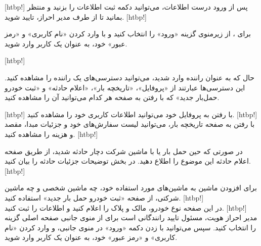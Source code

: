 	[htbp!]
 پس از ورود درست اطلاعات، می‌توانید دکمه ثبت اطلاعات را بزنید و منتظر بمانید تا از طرف مدیر احراز، تایید شوید.
[htbp!]

 
		 برای ، از زیرمنوی  گزینه «ورود» را انتخاب کنید و با وارد کردن «نام کاربری» و «رمز عبور» خود، به عنوان یک کاربر  وارد شوید.

	[htbp!]

	 حال که به عنوان راننده وارد شدید، می‌توانید دسترسی‌های یک راننده را مشاهده کنید. این دسترسی‌ها عبارتند از «پروفایل»، «تاریخچه بار»، «اعلام حادثه» و «ثبت خودرو حمل‌بار جدید» که با رفتن به صفحه هر کدام می‌توانید آن را مشاهده کنید.

	[htbp!]
		 با رفتن به پروفایل خود می‌توانید اطلاعات کاربری خود را مشاهده کنید.
	[htbp!]
	 با رفتن به صفحه تاریخچه بار، می‌توانید لیست سفارش‌های خود و جزئیات مبدا، مقصد و هزینه را مشاهده کنید.
\newpage
				[htbp!]

	 در صورتی که حین حمل بار یا با ماشین شرکت دچار حادثه شدید، از طریق صفحه اعلام حادثه این موضوع را اطلاع دهید. در بخش توضیحات جزئیات حادثه را بیان کنید.
				[htbp!]

	 برای افزودن ماشین به ماشین‌های مورد استفاده خود، چه ماشین شخصی و چه ماشین شرکتی، از صفحه «ثبت خودرو حمل بار جدید» استفاده کنید.
				[htbp!]
\\
در این صفحه نوع خودرو، مالک و پلاک را اعلام کنید و اطلاعات را ثبت کنید.
			[htbp!]
	 
			 مدیر احراز هویت، مسئول تایید رانندگانی است  برای  از منوی جانبی صفحه اصلی گزینه  را انتخاب کنید. سپس می‌توانید با زدن دکمه «ورود» در منوی جانبی، و وارد کردن «نام کاربری» و «رمز عبور» خود، به عنوان یک کاربر  وارد شوید.

